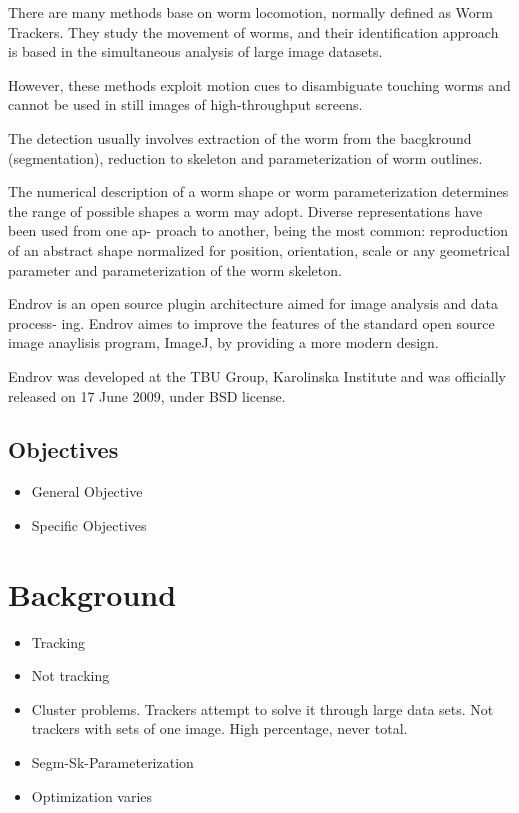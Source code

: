 \documentclass[12pt,letterpaper,oneside]{book}
\begin{document}
There are many methods base on worm locomotion, normally defined as Worm Trackers.
They study the movement of worms, and their identification approach is based
in the simultaneous analysis of large image datasets.

However, these methods exploit motion
cues to disambiguate touching worms and cannot be used
in still images of high-throughput screens.

The detection usually involves extraction of
the worm from the bacgkround (segmentation), reduction to skeleton and parameterization
of worm outlines.

 The numerical description of a worm shape or worm parameterization determines the range
of possible shapes a worm may adopt. Diverse representations have been used from one ap-
proach to another, being the most common: reproduction of an abstract shape normalized
for position, orientation, scale or any geometrical parameter and parameterization of the
worm skeleton.

  Endrov is an open source plugin architecture aimed for image analysis and data process-
ing. Endrov aimes to improve the features of the standard open source image anaylisis
program, ImageJ, by providing a more modern design.


  Endrov was developed at the TBU Group, Karolinska Institute and was officially released
on 17 June 2009, under BSD license.


\subsection*{Objectives}
\begin{itemize}
\item General Objective
\item Specific Objectives
\end{itemize}

\section*{Background}
\begin{itemize}
\item Tracking
\item Not tracking
\item Cluster problems. Trackers attempt to solve it through
  large data sets. Not trackers with sets of one image. High
  percentage, never total.
\item Segm-Sk-Parameterization
\item Optimization varies
\end{itemize}
\end{document}
